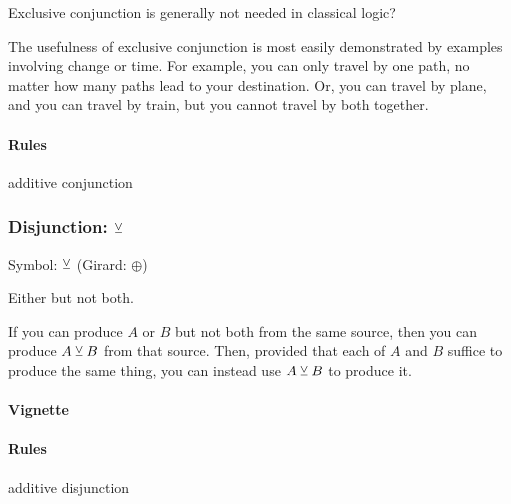 \documentclass{article}
\begin{document}
Exclusive conjunction is generally not needed in classical logic?

The usefulness of exclusive conjunction is most easily demonstrated by
examples involving change or time. For example, you can only travel by
one path, no matter how many paths lead to your destination. Or, you
can travel by plane, and you can travel by train, but you cannot
travel by both together.

\paragraph{Rules} additive conjunction


\subsubsection[Disjunction: either but not both]{Disjunction: \(\veebar\)}

Symbol: \(\veebar\) (Girard: \(\oplus\))

Either but not both.

If you can produce \(A\) or \(B\) but not both from the same source,
then you can produce \(A\veebar B\) from that source.
Then, provided that each of \(A\) and \(B\) suffice to produce
the same thing, you can instead use \(A\veebar B\) to produce it.


\paragraph{Vignette\\}

\paragraph{Rules} additive disjunction

\end{document}
